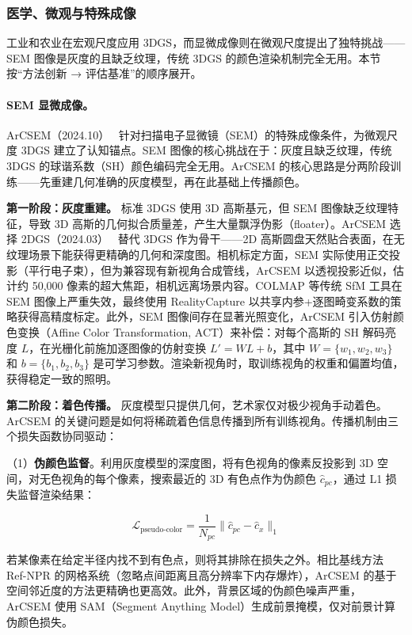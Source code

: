 \subsubsection{医学、微观与特殊成像}

工业和农业在宏观尺度应用 3DGS，而显微成像则在微观尺度提出了独特挑战——SEM 图像是灰度的且缺乏纹理，传统 3DGS 的颜色渲染机制完全无用。本节按“方法创新 → 评估基准”的顺序展开。

\paragraph{SEM 显微成像。}

ArCSEM（2024.10）~\cite{2410_21310} 针对扫描电子显微镜（SEM）的特殊成像条件，为微观尺度 3DGS 建立了认知锚点。SEM 图像的核心挑战在于：灰度且缺乏纹理，传统 3DGS 的球谐系数（SH）颜色编码完全无用。ArCSEM 的核心思路是分两阶段训练——先重建几何准确的灰度模型，再在此基础上传播颜色。

\textbf{第一阶段：灰度重建。}
标准 3DGS 使用 3D 高斯基元，但 SEM 图像缺乏纹理特征，导致 3D 高斯的几何拟合质量差，产生大量飘浮伪影（floater）。ArCSEM 选择 2DGS（2024.03）~\cite{2403_17888} 替代 3DGS 作为骨干——2D 高斯圆盘天然贴合表面，在无纹理场景下能获得更精确的几何和深度图。相机标定方面，SEM 实际使用正交投影（平行电子束），但为兼容现有新视角合成管线，ArCSEM 以透视投影近似，估计约 50,000 像素的超大焦距，相机远离场景内容。COLMAP 等传统 SfM 工具在 SEM 图像上严重失效，最终使用 RealityCapture 以共享内参+逐图畸变系数的策略获得高精度标定。此外，SEM 图像间存在显著光照变化，ArCSEM 引入仿射颜色变换（Affine Color Transformation, ACT）来补偿：对每个高斯的 SH 解码亮度 $L$，在光栅化前施加逐图像的仿射变换 $L' = WL + b$，其中 $W = \{w_1, w_2, w_3\}$ 和 $b = \{b_1, b_2, b_3\}$ 是可学习参数。渲染新视角时，取训练视角的权重和偏置均值，获得稳定一致的照明。

\textbf{第二阶段：着色传播。}
灰度模型只提供几何，艺术家仅对极少视角手动着色。ArCSEM 的关键问题是如何将稀疏着色信息传播到所有训练视角。传播机制由三个损失函数协同驱动：

（1）\textbf{伪颜色监督}。利用灰度模型的深度图，将有色视角的像素反投影到 3D 空间，对无色视角的每个像素，搜索最近的 3D 有色点作为伪颜色 $\hat{c}_{pc}$，通过 L1 损失监督渲染结果：

\begin{equation}
\mathcal{L}_{\text{pseudo-color}} = \frac{1}{N_{pc}} \|\hat{c}_{pc} - \hat{c}_{x}\|_1
\end{equation}

若某像素在给定半径内找不到有色点，则将其排除在损失之外。相比基线方法 Ref-NPR 的网格系统（忽略点间距离且高分辨率下内存爆炸），ArCSEM 的基于空间邻近度的方法更精确也更高效。此外，背景区域的伪颜色噪声严重，ArCSEM 使用 SAM（Segment Anything Model）生成前景掩模，仅对前景计算伪颜色损失。

